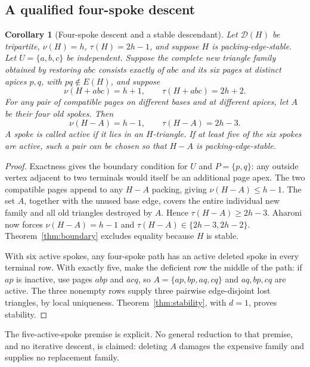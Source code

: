\documentclass[11pt]{article}
\newtheorem{corollary}[theorem]{Corollary}
\theoremstyle{definition}\newtheorem{definition}[theorem]{Definition}
\theoremstyle{remark}\newtheorem{remark}[theorem]{Remark}
\newcommand{\D}{\mathcal D}
\begin{document}
\subsection{A qualified four-spoke descent}\label{sec:descent}
\begin{corollary}[Four-spoke descent and a stable descendant]\label{cor:descent}
Let $\D(H)$ be tripartite, $\nu(H)=h$, $\tau(H)=2h-1$, and suppose $H$ is packing-edge-stable. Let $U=\{a,b,c\}$ be independent. Suppose the complete new triangle family obtained by restoring $abc$ consists exactly of $abc$ and its six pages at distinct apices $p,q$, with $pq\notin E(H)$, and suppose
\[
\nu(H+abc)=h+1,\qquad \tau(H+abc)=2h+2.
\]
For any pair of compatible pages on different bases and at different apices, let $A$ be their four old spokes. Then
\[
\nu(H-A)=h-1,\qquad \tau(H-A)=2h-3.
\]
A spoke is called active if it lies in an $H$-triangle. If at least five of the six spokes are active, such a pair can be chosen so that $H-A$ is packing-edge-stable.
\end{corollary}
\begin{proof}\leavevmode
Exactness gives the boundary condition for $U$ and $P=\{p,q\}$: any outside vertex adjacent to two terminals would itself be an additional page apex. The two compatible pages append to any $H-A$ packing, giving $\nu(H-A)\le h-1$. The set $A$, together with the unused base edge, covers the entire individual new family and all old triangles destroyed by $A$. Hence $\tau(H-A)\ge 2h-3$. Aharoni now forces $\nu(H-A)=h-1$ and $\tau(H-A)\in\{2h-3,2h-2\}$. Theorem~\ref{thm:boundary} excludes equality because $H$ is stable.

With six active spokes, any four-spoke path has an active deleted spoke in every terminal row. With exactly five, make the deficient row the middle of the path: if $ap$ is inactive, use pages $abp$ and $acq$, so $A=\{ap,bp,aq,cq\}$ and $aq,bp,cq$ are active. The three nonempty rows supply three pairwise edge-disjoint lost triangles, by local uniqueness. Theorem~\ref{thm:stability}, with $d=1$, proves stability.
\end{proof}
The five-active-spoke premise is explicit. No general reduction to that premise, and no iterative descent, is claimed: deleting $A$ damages the expensive family and supplies no replacement family.
\end{document}
